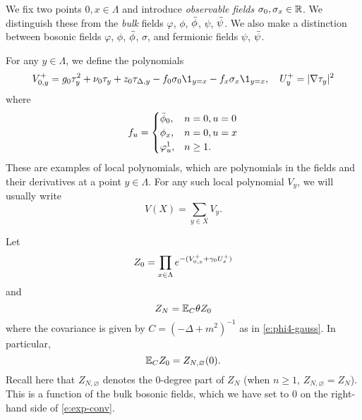 We fix two points $0,x\in \Lambda$
and introduce \emph{observable fields} $\sigma_0, \sigma_x \in {\mathbb R}$.
We distinguish these from the \emph{bulk} fields $\varphi$, $\phi$,
$\bar\phi$, $\psi$, $\bar\psi$. We also make a distinction between bosonic
fields $\varphi$, $\phi$, $\bar\phi$, $\sigma$, and fermionic fields
$\psi$, $\bar\psi$.

For any $y\in\Lambda$, we define the polynomials
\begin{equation}
\label{e:V0def}
\Vp^+_{0,y}
	=
g_0\tau_y^2 + \nu_0 \tau_y + z_0 \tau_{\Delta,y}
- f_0 \sigma_0 \1_{y=x}
- f_x \sigma_x \1_{y=x},
	\quad
U^+_y
	=
|\nabla \tau_y|^2
\end{equation}
where
\begin{equation}
\label{e:obs-couple}
f_u =
\begin{cases}
\bar\phi_0,		& n = 0, u = 0 \\
\phi_x,			& n = 0, u = x \\
\varphi^1_u,	& n \ge 1.
\end{cases}
\end{equation}
These are examples of local polynomials, which are polynomials
in the fields and their derivatives at a point $y\in\Lambda$. For any such local
polynomial $V_y$, we will usually write
\begin{equation}
\label{e:VX}
V(X) = \sum_{y\in X} V_y.
\end{equation}

Let
\begin{equation}
\label{e:Z0def}
Z_0 = \prod_{x\in \Lambda} e^{-(V^+_{0,x} + \gamma_0 U^+_x)}
\end{equation}
and
\begin{equation}
\label{e:ZNdef}
Z_N = \mathbb{E}_C \theta Z_0
\end{equation}
where the covariance is given by $C = (-\Delta + m^2)^{-1}$
as in \eqref{e:phi4-gauss}. In particular,
\begin{equation}
\label{e:exp-conv}
\mathbb{E}_C Z_0 = Z_{N,\varnothing}(0).
\end{equation}
Recall here that $Z_{N,\varnothing}$ denotes the $0$-degree part of $Z_N$
(when $n \ge 1$, $Z_{N,\varnothing} = Z_N$).
This is a function of the bulk bosonic fields, which we have set to $0$ on the
right-hand side of \eqref{e:exp-conv}.

